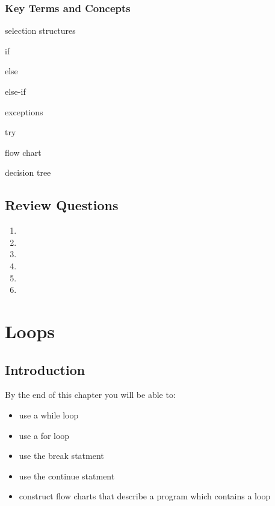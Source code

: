 \documentclass{book}
\begin{document}
    
        \subsection{Key Terms and Concepts}\label{key-terms-and-concepts}
    




    
        selection structures

if

else

else-if

exceptions

try

flow chart

decision tree
    




    
        \section{Review Questions}\label{review-questions}
    




    
        \begin{enumerate}
\def\labelenumi{\arabic{enumi}.}
\item
\item
\item
\item
\item
\item
\end{enumerate}
    




    
        \chapter{Loops}\label{loops}
    




    
        \section{Introduction}\label{introduction}
    




    
        By the end of this chapter you will be able to:

\begin{itemize}
\item
  use a while loop
\item
  use a for loop
\item
  use the break statment
\item
  use the continue statment
\item
  construct flow charts that describe a program which contains a loop
\end{itemize}
    
\end{document}
